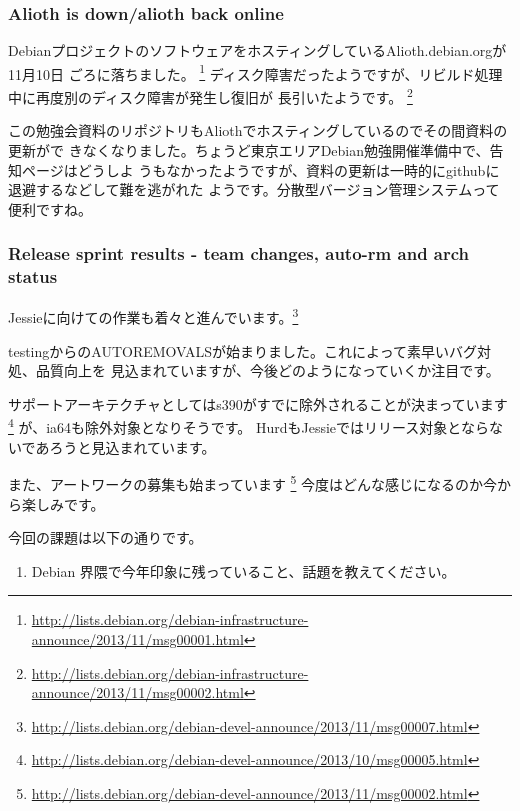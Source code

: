 \documentclass[mingoth,a4paper]{jsarticle}
\begin{document}
\subsubsection{Alioth is down/alioth back online}

DebianプロジェクトのソフトウェアをホスティングしているAlioth.debian.orgが11月10日
ごろに落ちました。
\footnote{\url{http://lists.debian.org/debian-infrastructure-announce/2013/11/msg00001.html}}
ディスク障害だったようですが、リビルド処理中に再度別のディスク障害が発生し復旧が
長引いたようです。
\footnote{\url{http://lists.debian.org/debian-infrastructure-announce/2013/11/msg00002.html}}

この勉強会資料のリポジトリもAliothでホスティングしているのでその間資料の更新がで
きなくなりました。ちょうど東京エリアDebian勉強開催準備中で、告知ページはどうしよ
うもなかったようですが、資料の更新は一時的にgithubに退避するなどして難を逃がれた
ようです。分散型バージョン管理システムって便利ですね。

\subsubsection{Release sprint results - team changes, auto-rm and arch status}
Jessieに向けての作業も着々と進んでいます。\footnote{\url{http://lists.debian.org/debian-devel-announce/2013/11/msg00007.html}}

testingからのAUTOREMOVALSが始まりました。これによって素早いバグ対処、品質向上を
見込まれていますが、今後どのようになっていくか注目です。

サポートアーキテクチャとしてはs390がすでに除外されることが決まっています
\footnote{\url{http://lists.debian.org/debian-devel-announce/2013/10/msg00005.html}}
が、ia64も除外対象となりそうです。
HurdもJessieではリリース対象とならないであろうと見込まれています。

また、アートワークの募集も始まっています
\footnote{\url{http://lists.debian.org/debian-devel-announce/2013/11/msg00002.html}}
今度はどんな感じになるのか今から楽しみです。


今回の課題は以下の通りです。
\begin{screen}
  \begin{enumerate}
  \item %
    Debian 界隈で今年印象に残っていること、話題を教えてください。
  \end{enumerate}
\end{screen}
\end{document}

